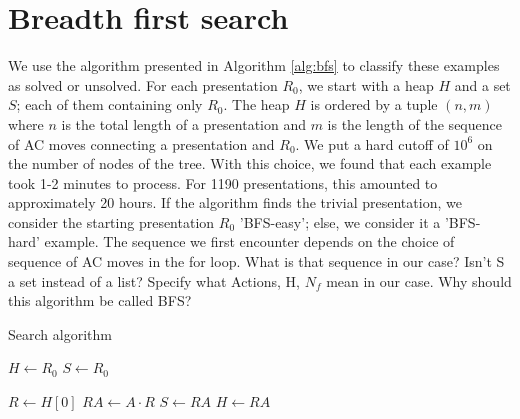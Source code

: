
\section{Breadth first search}




We use the algorithm presented in Algorithm \autoref{alg:bfs} to classify these examples as solved or unsolved.
For each presentation $R_0$, we start with a heap $H$ and a set $S$; each of them containing only $R_0$.
The heap $H$ is ordered by a tuple $(n, m)$ where $n$ is the total length of a presentation and $m$ is the length of the sequence of AC moves connecting a presentation and $R_0$.
We put a hard cutoff of $10^6$ on the number of nodes of the tree. With this choice, we found that each example took 1-2 minutes to process.
For 1190 presentations, this amounted to approximately 20 hours. 
If the algorithm finds the trivial presentation, we consider the starting presentation $R_0$ 'BFS-easy'; else, we consider it a 'BFS-hard' example.
The sequence we first encounter depends on the choice of sequence of AC moves in the for loop.
What is that sequence in our case?
Isn't S a set instead of a list? Specify what Actions, H, $N_f$ mean in our case.
Why should this algorithm be called BFS?

\begin{algorithm}
	\caption{Search algorithm}\label{alg:bfs}
	\begin{algorithmic}
		\State $H \gets R_0$ 
		\State $S \gets R_0$ 

		 
		\State $R \gets H[0]$ 
		\State $RA \gets A \cdot R$ 
		\State $S \gets RA$
		\State $H \gets RA$ 

		\EndIf
		\EndFor
		\EndWhile
	\end{algorithmic}
\end{algorithm}

